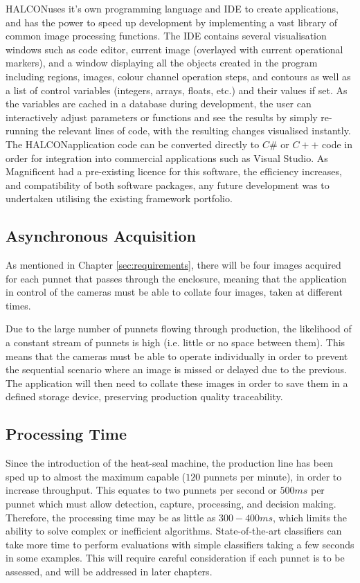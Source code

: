 \documentclass[fleqn,twoside,12pt]{report}
\begin{document}
HALCON\texttrademark uses it's own programming language and IDE to create applications, and has the power to speed up development by implementing a vast library of common image processing functions. The IDE contains several visualisation windows such as code editor, current image (overlayed with current operational markers), and a window displaying all the objects created in the program including regions, images, colour channel operation steps, and contours as well as a list of control variables (integers, arrays, floats, etc.) and their values if set. As the variables are cached in a database during development, the user can interactively adjust parameters or functions and see the results by simply re-running the relevant lines of code, with the resulting changes visualised instantly. The HALCON\texttrademark application code can be converted directly to $C\#$ or $C++$ code in order for integration into commercial applications such as Visual Studio\textregistered. As Magnificent had a pre-existing licence for this software, the efficiency increases, and compatibility of both software packages, any future development was to undertaken utilising the existing framework portfolio.


\subsection{Asynchronous Acquisition}

As mentioned in Chapter \ref{sec:requirements}, there will be four images acquired for each punnet that passes through the enclosure, meaning that the application in control of the cameras must be able to collate four images, taken at different times.

Due to the large number of punnets flowing through production, the likelihood of a constant stream of punnets is high (i.e. little or no space between them). This means that the cameras must be able to operate individually in order to prevent the sequential scenario where an image is missed or delayed due to the previous. The application will then need to collate these images in order to save them in a defined storage device, preserving production quality traceability.    

\subsection{Processing Time}

Since the introduction of the heat-seal machine, the production line has been sped up to almost the maximum capable ($120$ punnets per minute), in order to increase throughput. This equates to two punnets per second or $500ms$ per punnet which must allow detection, capture, processing, and decision making. Therefore, the processing time may be as little as $300-400ms$, which limits the ability to solve complex or inefficient algorithms. State-of-the-art classifiers can take more time to perform evaluations with simple classifiers taking a few seconds in some examples. This will require careful consideration if each punnet is to be assessed, and will be addressed in later chapters.
\end{document}
